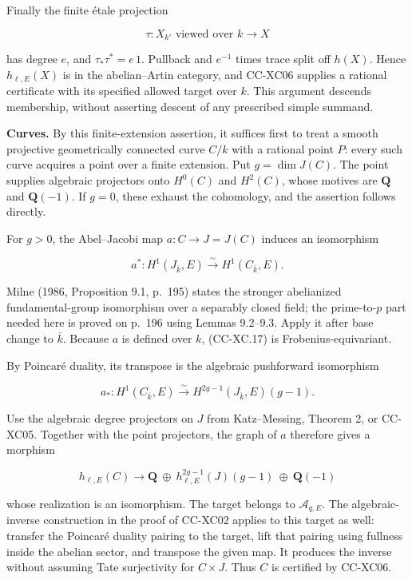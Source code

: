 Finally the finite étale projection

\[
 \tau:X_{k'}\text{ viewed over }k\longrightarrow X
\]

has degree \(e\), and \(\tau_*\tau^*=e\,1\). Pullback and \(e^{-1}\)
times trace split off \(h(X)\). Hence \(h_{\ell,E}(X)\) is in the
abelian--Artin category, and CC-XC06 supplies a rational certificate
with its specified allowed target over \(k\). This argument descends
membership, without asserting descent of any prescribed simple summand.

\textbf{Curves.} By this finite-extension assertion, it suffices first
to treat a smooth projective geometrically connected curve \(C/k\) with
a rational point \(P\): every such curve acquires a point over a finite
extension. Put \(g=\dim J(C)\). The point supplies algebraic projectors
onto \(H^0(C)\) and \(H^2(C)\), whose motives are \(\mathbf Q\) and
\(\mathbf Q(-1)\). If \(g=0\), these exhaust the cohomology, and the
assertion follows directly.

For \(g>0\), the Abel--Jacobi map \(a:C\to J=J(C)\) induces an
isomorphism

\[
 a^*:H^1(J_{\bar k},E)\xrightarrow{\sim}H^1(C_{\bar k},E).
 \tag{CC-XC.17}
\]

Milne (1986, Proposition 9.1, p.~195) states the stronger abelianized
fundamental-group isomorphism over a separably closed field; the
prime-to-\(p\) part needed here is proved on p.~196 using Lemmas
9.2--9.3. Apply it after base change to \(\bar k\). Because \(a\) is
defined over \(k\), (CC-XC.17) is Frobenius-equivariant.

By Poincaré duality, its transpose is the algebraic pushforward
isomorphism

\[
 a_*:H^1(C_{\bar k},E)
       \xrightarrow{\sim}H^{2g-1}(J_{\bar k},E)(g-1).
 \tag{CC-XC.18}
\]

Use the algebraic degree projectors on \(J\) from Katz--Messing, Theorem
2, or CC-XC05. Together with the point projectors, the graph of \(a\)
therefore gives a morphism

\[
 h_{\ell,E}(C)\longrightarrow
 \mathbf Q\ \oplus\
 h^{2g-1}_{\ell,E}(J)(g-1)\
 \oplus\ \mathbf Q(-1)
 \tag{CC-XC.19}
\]

whose realization is an isomorphism. The target belongs to
\(\mathcal A_{q,E}\). The algebraic-inverse construction in the proof of
CC-XC02 applies to this target as well: transfer the Poincaré duality
pairing to the target, lift that pairing using fullness inside the
abelian sector, and transpose the given map. It produces the inverse
without assuming Tate surjectivity for \(C\times J\). Thus \(C\) is
certified by CC-XC06.

